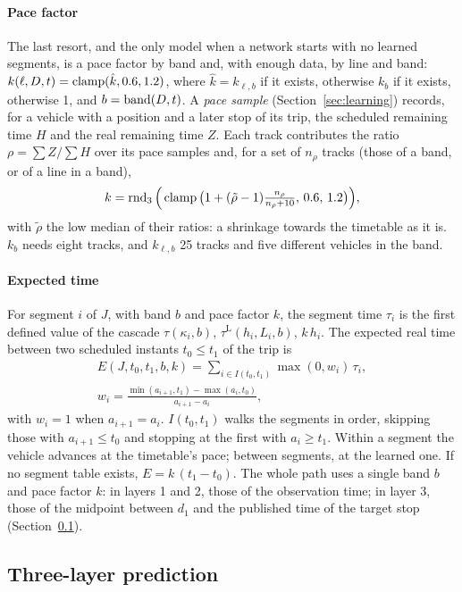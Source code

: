 \paragraph{Pace factor} The last resort, and the only model when a network starts with no learned segments, is a pace
factor by band and, with enough data, by line and band: $k(\ell,D,t)=\operatorname{clamp}(\hat k,0.6,1.2)$, where
$\hat k=k_{\ell,b}$ if it exists, otherwise $k_b$ if it exists, otherwise 1, and $b=\operatorname{band}(D,t)$. A \emph{pace sample}
(Section~\ref{sec:learning}) records, for a vehicle with a position and a later stop of its trip, the scheduled
remaining time $H$ and the real remaining time $Z$. Each track contributes the ratio $\rho=\sum Z/\sum H$ over its pace
samples and, for a set of $n_\rho$ tracks (those of a band, or of a line in a band),
\begin{equation}
k=\operatorname{rnd}_3\Big(\operatorname{clamp}\big(1+(\tilde\rho-1)\tfrac{n_\rho}{n_\rho+10},\,0.6,\,1.2\big)\Big),
\label{eq:pace}
\end{equation}
with $\tilde\rho$ the low median of their ratios: a shrinkage towards the timetable as it is. $k_b$ needs eight
tracks, and $k_{\ell,b}$ 25 tracks and five different vehicles in the band.

\paragraph{Expected time} For segment $i$ of $J$, with band $b$ and pace factor $k$, the segment time $\tau_i$ is the
first defined value of the cascade $\tau(\kappa_i,b)$, $\tau^{\mathrm L}(h_i,L_i,b)$, $k\,h_i$. The expected real time
between two scheduled instants $t_0\le t_1$ of the trip is
\begin{gather}
E(J,t_0,t_1,b,k)=\sum_{i\in I(t_0,t_1)}\max(0,w_i)\,\tau_i,\label{eq:expected}\\
w_i=\frac{\min(a_{i+1},t_1)-\max(a_i,t_0)}{a_{i+1}-a_i},\nonumber
\end{gather}
with $w_i=1$ when $a_{i+1}=a_i$. $I(t_0,t_1)$ walks the segments in order, skipping those with $a_{i+1}\le t_0$ and
stopping at the first with $a_i\ge t_1$. Within a segment the vehicle advances at the timetable's pace; between
segments, at the learned one. If no segment table exists, $E=k\,(t_1-t_0)$. The whole path uses a single band $b$ and
pace factor $k$: in layers 1 and 2, those of the observation time; in layer 3, those of the midpoint between $d_1$ and
the published time of the target stop (Section~\ref{sec:layers}).

\subsection{Three-layer prediction}
\label{sec:layers}

